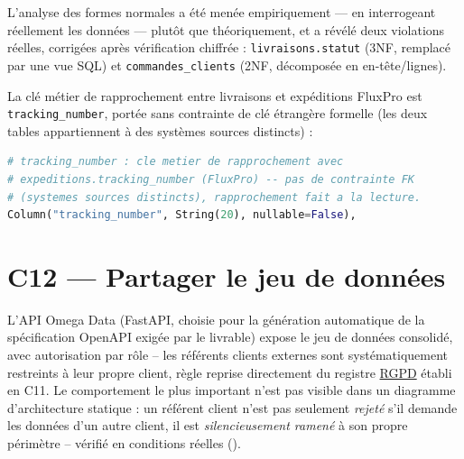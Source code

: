 L'analyse des formes normales a été menée empiriquement --- en
interrogeant réellement les données --- plutôt que théoriquement, et a
révélé deux violations réelles, corrigées après vérification chiffrée :
\texttt{livraisons.statut} (3NF, remplacé par une vue SQL) et
\texttt{commandes\_clients} (2NF, décomposée en en-tête/lignes).

La clé métier de rapprochement entre livraisons et expéditions FluxPro
est \texttt{tracking\_number}, portée sans contrainte de clé étrangère
formelle (les deux tables appartiennent à des systèmes sources
distincts) :

\begin{lstlisting}[language=Python,caption={Clé de rapprochement \texttt{tracking\_number} (\filepath{src/datacore/storage/staging/models.py})}]
# tracking_number : cle metier de rapprochement avec
# expeditions.tracking_number (FluxPro) -- pas de contrainte FK
# (systemes sources distincts), rapprochement fait a la lecture.
Column("tracking_number", String(20), nullable=False),
\end{lstlisting}

\section{C12 --- Partager le jeu de données}

L'API Omega Data (FastAPI, choisie pour la génération automatique de
la spécification OpenAPI exigée par le livrable) expose le jeu de
données consolidé, avec autorisation par rôle -- les référents clients
externes sont systématiquement restreints à leur propre client, règle
reprise directement du registre \hyperref[gloss:rgpd]{RGPD} établi en
C11. Le comportement le plus important n'est pas visible dans un
diagramme d'architecture statique : un référent client n'est pas
seulement \textit{rejeté} s'il demande les données d'un autre client,
il est \textit{silencieusement ramené} à son propre périmètre --
vérifié en conditions réelles
().

